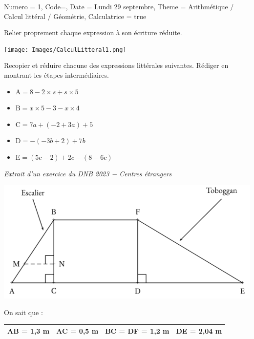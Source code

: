 \documentclass[11pt]{article}
\begin{document}
\begin{Maquette}[IE]{
        Numero = 1, Code={}, Date = Lundi 29 septembre, Theme = Arithmétique / Calcul littéral / Géométrie, Calculatrice = true
    }
    \begin{multicols}{2}
        \begin{exercice}
             Relier proprement chaque expression à son écriture réduite.
            \begin{center}
                \texttt{[image: Images/CalculLitteral1.png]}
            \end{center}
        \end{exercice}
        \columnbreak
        \begin{exercice}
            Recopier et réduire chacune des expressions littérales suivantes. Rédiger en montrant les étapes intermédiaires.
            \begin{itemize}
                \item $\textrm{A}=8 - 2 \times s + s \times 5$
                \item $\textrm{B}=x \times 5 - 3 - x \times 4$
                \item $\textrm{C}= 7a + (-2 + 3a) + 5$
                \item $\textrm{D}= - (- 3b + 2) + 7b$
                \item $\textrm{E}=(5c - 2) + 2c - (8 - 6c)$
            \end{itemize}
        \end{exercice}
    \end{multicols}

    \begin{exercice}
            \emph{Extrait d’un exercice du DNB 2023 − Centres étrangers}
            \begin{center}
                \includegraphics[width=.75\linewidth]{Images/Géométrie1.png}
            \end{center}
             On sait que :
            \begin{center}
                      \renewcommand{\arraystretch}{1.2}
                      \begin{tabular}{|*{4}{c|}}
                          \hline
                      AB = 1,3 m       & AC = 0,5 m             &  BC = DF = 1,2 m & DE = 2,04 m         \\
                          \hline
                      \end{tabular}
                  \end{center}
 

\end{exercice}
\end{Maquette}
\end{document}
